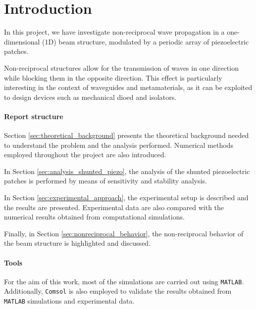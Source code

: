 \section{Introduction}
\label{sec:introduction}

In this project, we have investigate non-reciprocal wave propagation in a one-dimensional (1D) beam structure, modulated by a periodic array of piezoelectric patches.

Non-reciprocal structures allow for the transmission of waves in one direction while blocking them in the opposite direction.
This effect is particularly interesting in the context of waveguides and metamaterials, as it can be exploited to design devices such as mechanical dioed and isolators.

\paragraph{Report structure}

Section \ref{sec:theoretical_background} presents the theoretical background needed to understand the problem and the analysis performed.
Numerical methods employed throughout the project are also introduced.

In Section \ref{sec:analysis_shunted_piezo}, the analysis of the shunted piezoelectric patches is performed by means of sensitivity and stability analysis.

In Section \ref{sec:experimental_approach}, the experimental setup is described and the results are presented.
Experimental data are also compared with the numerical results obtained from computational simulations.

Finally, in Section \ref{sec:nonreciprocal_behavior}, the non-reciprocal behavior of the beam structure is highlighted and discussed.

\paragraph{Tools}

For the aim of this work, most of the simulations are carried out using \texttt{MATLAB}.
Additionally, \texttt{Comsol} is also employed to validate the results obtained from \texttt{MATLAB} simulations and experimental data.
